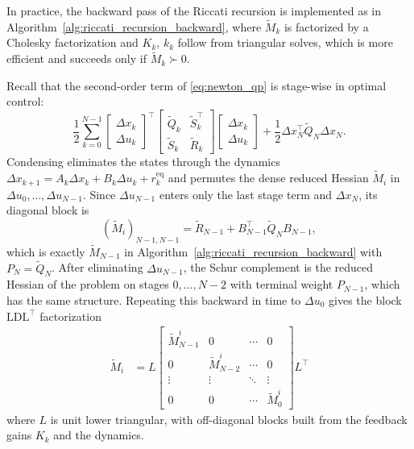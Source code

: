 \documentclass[class=scrbook, crop=false]{standalone}
\begin{document}
In practice, 
the backward pass of the Riccati recursion is implemented as in Algorithm~\ref{alg:riccati_recursion_backward},
where $\tilde{M}_k$ is factorized by a Cholesky factorization and $K_k$, $k_k$ follow from triangular solves,
which is more efficient and succeeds only if $\tilde{M}_k \succ 0$.

Recall that the second-order term of \eqref{eq:newton_qp} is stage-wise in optimal control:
\begin{equation*}
    \frac{1}{2} \sum_{k=0}^{N-1}
    \begin{bmatrix} \Delta x_k \\ \Delta u_k \end{bmatrix}^\top
    \begin{bmatrix} \tilde{Q}_k & \tilde{S}_k^\top \\ \tilde{S}_k & \tilde{R}_k \end{bmatrix}
    \begin{bmatrix} \Delta x_k \\ \Delta u_k \end{bmatrix}
    + \frac{1}{2} \Delta x_N^\top \tilde{Q}_N \Delta x_N.
\end{equation*}
Condensing eliminates the states through the dynamics $\Delta x_{k+1} = A_k \Delta x_k + B_k \Delta u_k + r_k^{\mathrm{eq}}$
and permutes the dense reduced Hessian $\tilde{M}_i$ in $\Delta u_0, \dots, \Delta u_{N-1}$.
Since $\Delta u_{N-1}$ enters only the last stage term and $\Delta x_N$, its diagonal block is
\begin{equation*}
    (\tilde{M}_i)_{N-1,N-1} = \tilde{R}_{N-1} + B_{N-1}^\top \tilde{Q}_N B_{N-1},
\end{equation*}
which is exactly $\tilde{M}_{N-1}$ in Algorithm~\ref{alg:riccati_recursion_backward} with $P_N = \tilde{Q}_N$.
After eliminating $\Delta u_{N-1}$, the Schur complement is the reduced Hessian of the problem on stages $0, \dots, N-2$ with terminal weight $P_{N-1}$, which has the same structure.
Repeating this backward in time to $\Delta u_0$ gives the block $\mathrm{LD}\mathrm{L}^\top$ factorization
\begin{align*}
    \tilde{M}_i &= L
    \begin{bmatrix}
    \tilde{M}_{N-1}^i & 0 & \cdots & 0 \\
    0 & \tilde{M}_{N-2}^i & \cdots & 0 \\
    \vdots & \vdots & \ddots & \vdots \\
    0 & 0 & \cdots & \tilde{M}_{0}^i
    \end{bmatrix}
    L^\top
\end{align*}
where $L$ is unit lower triangular, with off-diagonal blocks built from the feedback gains $K_k$ and the dynamics.
\end{document}
